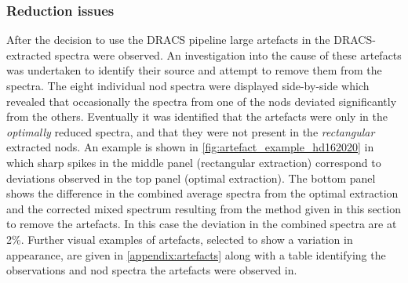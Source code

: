 
\subsubsection{Reduction issues}
\label{subsubsec:reductionartefacts}
After the decision to use the {DRACS} pipeline large artefacts in the {DRACS}-extracted spectra were observed.
An investigation into the cause of these artefacts was undertaken to identify their source and attempt to remove them from the spectra.
The eight individual nod spectra were displayed side-by-side which revealed that occasionally the spectra from one of the nods deviated significantly from the others.
Eventually it was identified that the artefacts were only in the \emph{optimally} reduced spectra, and that they were not present in the \emph{rectangular} extracted nods.
An example is shown in \cref{fig:artefact_example_hd162020} in which sharp spikes in the middle panel (rectangular extraction) correspond to deviations observed in the top panel (optimal extraction).
The bottom panel shows the difference in the combined average spectra from the optimal extraction and the corrected mixed spectrum resulting from the method given in this section to remove the artefacts.
In this case the deviation in the combined spectra are at 2\%.
Further visual examples of artefacts, selected to show a variation in appearance, are given in \cref{appendix:artefacts} along with a table identifying the observations and nod spectra the artefacts were observed in.

